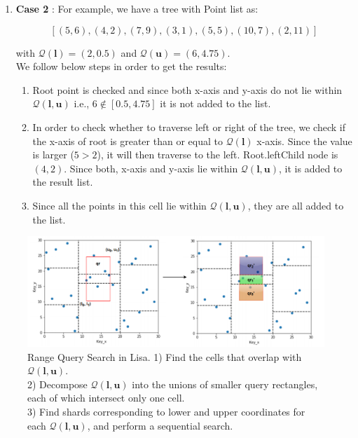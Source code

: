 \begin{mscexample}
\begin{enumerate}
	 \item\textbf{Case 2} : For example, we have a tree with Point list as: 

	$$[(5,6),(4,2),(7,9),(3,1),(5,5),(10,7),(2,11)]$$
	
	with $\mathcal{Q}(\boldsymbol{l}) = (2,0.5)$ and $\mathcal{Q}(\boldsymbol{u}) = (6,4.75)$. \\
	We follow below steps in order to get the results:
	\begin{enumerate}
    	\item Root point is checked and since both x-axis and y-axis do not lie within $\mathcal{Q}(\boldsymbol{l}, \boldsymbol{u})$ i.e., $6 \notin [0.5, 4.75]$ it is not added to the list.
    	
    	\item In order to check whether to traverse left or right of the tree, we check if the x-axis of root is greater than or equal to $\mathcal{Q}(\boldsymbol{l})$ x-axis. Since the value is larger ($5 > 2$), it will then traverse to the left. Root.leftChild node is $(4,2)$. Since both, x-axis and y-axis lie within $\mathcal{Q}(\boldsymbol{l}, \boldsymbol{u})$, it is added to the result list. 
    	
    	\item Since all the points in this cell lie within $\mathcal{Q}(\boldsymbol{l}, \boldsymbol{u})$, they are all added to the list.
    	
    \end{enumerate}	
\end{enumerate}
\end{mscexample}

\begin{figure}[t]
    \centering
    \includegraphics[width=1\textwidth]{graphs/range_query_lisa.png}
    \caption{Range Query Search in Lisa.
    1) Find the cells that overlap with $\mathcal{Q}(\boldsymbol{l}, \boldsymbol{u})$. \\
    2) Decompose $\mathcal{Q}(\boldsymbol{l}, \boldsymbol{u})$ into the unions of smaller query rectangles, each of which intersect only one cell. \\
    3) Find shards corresponding to lower and upper coordinates for each $\mathcal{Q}(\boldsymbol{l}, \boldsymbol{u})$, and perform a sequential search. }
    \label{fig:Range_Query_Lisa}
\end{figure}


